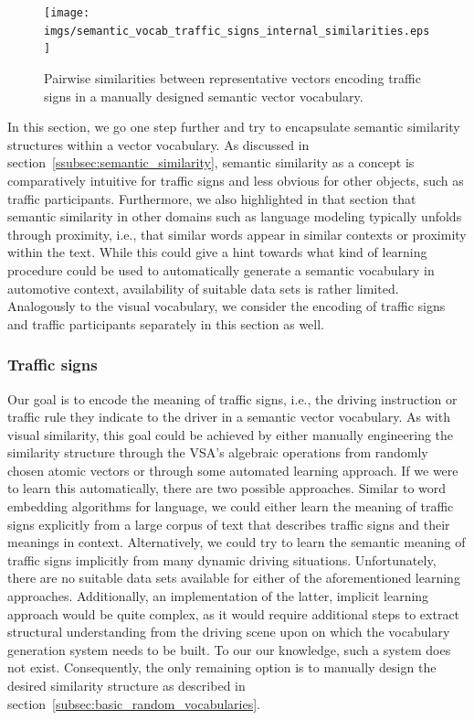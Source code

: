\begin{figure}[t]
    \centering
    \texttt{[image: imgs/semantic\_vocab\_traffic\_signs\_internal\_similarities.eps]}
    \caption{Pairwise similarities between representative vectors encoding traffic signs in a manually designed semantic vector vocabulary.}
    \label{fig:semantic_vocab_traffic_signs_internal_similarities}
\end{figure}
In this section, we go one step further and try to encapsulate semantic similarity structures within a vector vocabulary.
As discussed in section~\ref{ssubsec:semantic_similarity}, semantic similarity as a concept is comparatively intuitive for traffic signs and less obvious for other objects, such as traffic participants.
Furthermore, we also highlighted in that section that semantic similarity in other domains such as language modeling typically unfolds through proximity, i.e., that similar words appear in similar contexts or proximity within the text.
While this could give a hint towards what kind of learning procedure could be used to automatically generate a semantic vocabulary in automotive context, availability of suitable data sets is rather limited.
Analogously to the visual vocabulary, we consider the encoding of traffic signs and traffic participants separately in this section as well. 

\subsubsection{Traffic signs}%
\label{ssubsec:traffic_signs}

Our goal is to encode the meaning of traffic signs, i.e., the driving instruction or traffic rule they indicate to the driver in a semantic vector vocabulary.
As with visual similarity, this goal could be achieved by either manually engineering the similarity structure through the \ac{VSA}'s algebraic operations from randomly chosen atomic vectors or through some automated learning approach.
If we were to learn this automatically, there are two possible approaches. 
Similar to word embedding algorithms for language, we could either learn the meaning of traffic signs explicitly from a large  corpus of text that describes traffic signs and their meanings in context.
Alternatively, we could try to learn the semantic meaning of traffic signs implicitly from many dynamic driving situations.
Unfortunately, there are no suitable data sets available for either of the aforementioned learning approaches.
Additionally, an implementation of the latter, implicit learning approach would be quite complex, as it would require additional steps to extract structural understanding from the driving scene upon on which the vocabulary generation system needs to be built.
To our our knowledge, such a system does not exist.
Consequently, the only remaining option is to manually design the desired similarity structure as described in section~\ref{subsec:basic_random_vocabularies}.

